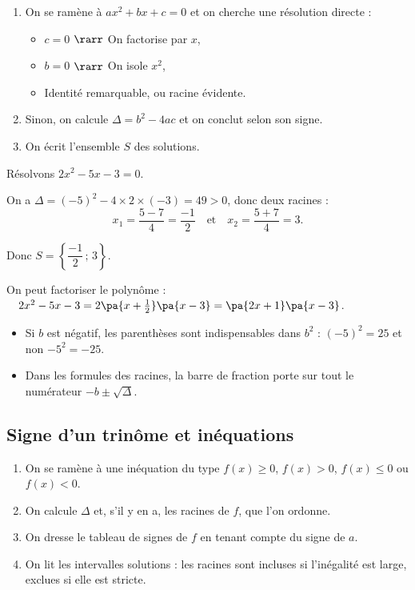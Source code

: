 \begin{methode}
	\nline
	\begin{enumerate}
		\item On se ramène à $ax^2 + bx + c = 0$ et on cherche une résolution directe :
		      \begin{itemize}
			      \item $c = 0$ $\rarr$ On factorise par $x$,
			      \item $b = 0$ $\rarr$ On isole $x^2$,
			      \item Identité remarquable, ou racine évidente.
		      \end{itemize}
		\item Sinon, on calcule $\Delta = b^2 - 4ac$ et on conclut selon son signe.
		\item On écrit l'ensemble $S$ des solutions.
	\end{enumerate}
\end{methode}

\begin{ex}
	Résolvons $2x^2 - 5x - 3 = 0$.

	On a $\Delta = (-5)^2 - 4 \times 2 \times (-3) = 49 > 0$, donc deux racines :
	\[
		x_1 = \dfrac{5 - 7}{4} = \dfrac{-1}{2} \quad \text{et} \quad x_2 = \dfrac{5 + 7}{4} = 3.
	\]

	Donc $S = \left\{\dfrac{-1}{2}\,;\,3\right\}$.

	On peut factoriser le polynôme : $\quad 2x^2 - 5x - 3 = 2\pa{x + \frac{1}{2}}\pa{x-3} = \pa{2x + 1}\pa{x - 3}$.
\end{ex}

\begin{piege}
	\nline
	\begin{itemize}
		\item Si $b$ est négatif, les parenthèses sont indispensables dans $b^2$ : $(-5)^2 = 25$ et non $-5^2 = -25$.
		\item Dans les formules des racines, la barre de fraction porte sur tout le numérateur $-b \pm \sqrt{\Delta}$.
	\end{itemize}
\end{piege}

\subsection{Signe d'un trinôme et inéquations}

\begin{methode}
	\nline
	\begin{enumerate}
		\item On se ramène à une inéquation du type $f(x) \geq 0$, $f(x) > 0$, $f(x) \leq 0$ ou $f(x) < 0$.
		\item On calcule $\Delta$ et, s'il y en a, les racines de $f$, que l'on ordonne.
		\item On dresse le tableau de signes de $f$ en tenant compte du signe de $a$.
		\item On lit les intervalles solutions : les racines sont incluses si l'inégalité est large, exclues si elle est stricte.
	\end{enumerate}
\end{methode}

